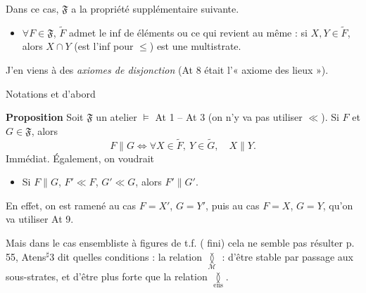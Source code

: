 \documentclass[11pt,a4paper]{article}
\begin{document}
Dans ce cas, $\mathfrak{F}$ a la propriété supplémentaire suivante. \struck{\ill{}}
\begin{itemize}
  \item[(1.57)] $\forall F \in \mathfrak{F}$, $\widetilde{F}$ admet le inf de  éléments  ou ce qui revient au même : si $X, Y \in \widetilde{F}$, \ill{} \ill{} \ill{} alors $X \cap Y$ (est l'inf pour $\leq$) est une multistrate.
\end{itemize}


J'en viens à des \emph{axiomes de disjonction} (At 8 était l'« axiome des lieux »).

Notations et d'abord

\textbf{Proposition} Soit $\mathfrak{F}$ un atelier \add{\ill{}} $\vDash$ At 1 -- At 3 (on n'y va pas utiliser $\ll$). Si $F$ et $G \in \mathfrak{F}$, alors
\[
  F \parallel G \Longleftrightarrow \forall X \in \widetilde{F},\ Y \in \widetilde{G},\quad X \parallel Y .
\]
Immédiat. Également, \struck{\ill{}} on voudrait
\begin{itemize}
  \item[(1.58)]   Si $F \parallel G$, $F' \ll F$, $G' \ll G$, alors $F' \parallel G'$.
\end{itemize}
En effet, \struck{\ill{}} on est ramené au cas \add{(\ill{} \ill{})} $F = X'$, $G = Y'$, puis au cas $F = X$, $G = Y$, qu'on va utiliser At 9.


Mais  dans le cas ensembliste à figures de t.f. (\ill{} \ill{} fini) cela ne semble pas résulter \ill{} \ill{} \ill{} \ill{} p. 55, \ill{} \ill{} Atens$^{\sharp}$3 \ill{} \ill{} dit quelles conditions \ill{} : la relation $\underset{\mathcal{M}}{\between}$ \struck{\ill{}} : d'être stable par passage aux sous-strates, et d'être plus forte que la relation $\underset{\mathrm{ens}}{\between}$.
\end{document}
